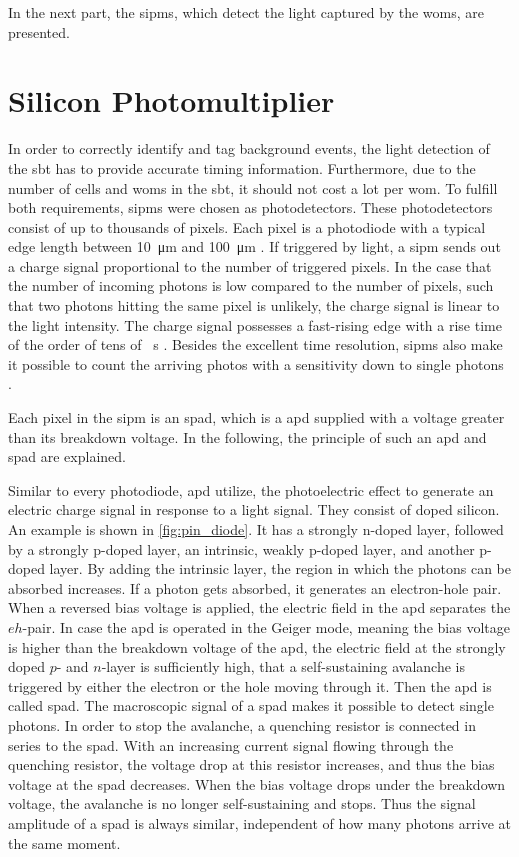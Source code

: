 In the next part, the \acp{sipm}, which detect the light captured by the \acp{wom}, are presented.


\section{Silicon Photomultiplier}
In order to correctly identify and tag background events, the light detection of the \ac{sbt} has to provide accurate timing information.
Furthermore, due to the number of cells and \acp{wom} in the \ac{sbt}, it should not cost a lot per \ac{wom}.
To fulfill both requirements, \acp{sipm} were chosen as photodetectors.
These photodetectors consist of up to thousands of pixels.
Each pixel is a photodiode with a typical edge length between \SI{10}{\micro\meter} and \SI{100}{\micro\meter} \cite{nucl}.
If triggered by light, a \ac{sipm} sends out a charge signal proportional to the number of triggered pixels.
In the case that the number of incoming photons is low compared to the number of pixels, such that two photons hitting the same pixel is unlikely, the charge signal is linear to the light intensity.
The charge signal possesses a fast-rising edge with a rise time of the order of tens of \si{\piko\second} \cite{nucl}.
Besides the excellent time resolution, \acp{sipm} also make it possible to count the arriving photos with a sensitivity down to single photons \cite{HAMA_mppc}.

Each pixel in the \ac{sipm} is an \ac{spad}, which is a \ac{apd} supplied with a voltage greater than its breakdown voltage.
In the following, the principle of such an \ac{apd} and \ac{spad} are explained.

Similar to every photodiode, \ac{apd} utilize, the photoelectric effect to generate an electric charge signal in response to a light signal.
They consist of doped silicon.
An example is shown in \autoref{fig:pin_diode}.
It has a strongly n-doped layer, followed by a strongly p-doped layer, an intrinsic, weakly p-doped layer, and another p-doped layer.
By adding the intrinsic layer, the region in which the photons can be absorbed increases.
If a photon gets absorbed, it generates an electron-hole pair.
When a reversed bias voltage is applied, the electric field in the \ac{apd} separates the $eh$-pair.
In case the \ac{apd} is operated in the Geiger mode, meaning the bias voltage is higher than the breakdown voltage of the \ac{apd}, the electric field at the strongly doped $p$- and $n$-layer is sufficiently high, that a self-sustaining avalanche is triggered by either the electron or the hole moving through it.
Then the \ac{apd} is called \ac{spad}.
The macroscopic signal of a \ac{spad} makes it possible to detect single photons.
In order to stop the avalanche, a quenching resistor is connected in series to the \ac{spad}.
With an increasing current signal flowing through the quenching resistor, the voltage drop at this resistor increases, and thus the bias voltage at the \ac{spad} decreases.
When the bias voltage drops under the breakdown voltage, the avalanche is no longer self-sustaining and stops.
Thus the signal amplitude of a \ac{spad} is always similar, independent of how many photons arrive at the same moment.


